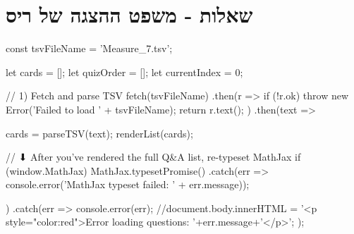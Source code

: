 \documentclass{tstextbook}
\begin{document}
  \section{שאלות - משפט ההצגה של ריס}


    const tsvFileName = 'Measure_7.tsv';

    let cards = [];
    let quizOrder = [];
    let currentIndex = 0;

    // 1) Fetch and parse TSV
fetch(tsvFileName)
  .then(r => {
    if (!r.ok) throw new Error('Failed to load ' + tsvFileName);
    return r.text();
  })
  .then(text => {
    cards = parseTSV(text);
    renderList(cards);

    // ⬇ After you’ve rendered the full Q&A list, re-typeset MathJax
    if (window.MathJax) {
      MathJax.typesetPromise()
        .catch(err => console.error('MathJax typeset failed: ' + err.message));
    }
  })
  .catch(err => {
    console.error(err);
    //document.body.innerHTML =  '<p style="color:red">Error loading questions: '+err.message+'</p>';
  });
\end{document}
